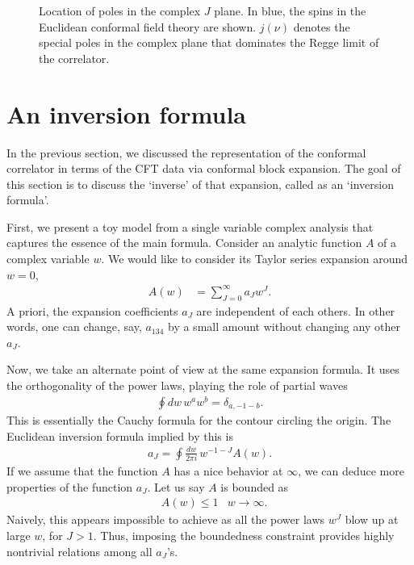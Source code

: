 \begin{figure}[t]
{
  }
  \caption{Location of poles in the complex $ J$ plane.
    In blue, the spins in the Euclidean conformal field theory are shown.
    $ j\left( \nu \right)  $ denotes the special poles in the complex plane that dominates the Regge limit of the correlator.}
  \label{fig:polesInJ}
\end{figure}

\section{An inversion formula}
In the previous section, we discussed the representation of the conformal correlator in terms of the CFT data via conformal block expansion.
The goal of this section is to discuss the `inverse' of that expansion, called as an `inversion formula'.

First, we present a toy model from a single variable complex analysis that captures the essence of the main formula.
Consider an analytic function $ A $ of a complex variable $ w $.
We would like to consider its Taylor series expansion around $ w = 0 $,
\begin{align}
  A\left( w \right) & = \sum_{J= 0 }^{\infty} a_J w^J
  .
\end{align}
A priori, the expansion coefficients $ a_J $ are independent of each others.
In other words, one can change, say, $ a_{134} $ by a small amount without changing any other $ a_J $.

Now, we take an alternate point of view at the same expansion formula.
It uses the orthogonality of the power laws, playing the role of partial waves
\begin{align}
  \oint dw \, w^a w^b = \delta_{a,-1-b}
  .
\end{align}
This is essentially the Cauchy formula for the contour circling the origin.
The Euclidean inversion formula implied by this is
\begin{align}
  a_J  =  \oint \frac{dw}{2\pi i} \, w^{-1-J} A\left( w \right)
  .
\end{align}
If we assume that the function $ A $ has a nice behavior at $ \infty $, we can deduce more properties of the function $ a_J $.
Let us say $ A $ is bounded as
\begin{align}
   & A\left( w \right) \leq 1 & w \rightarrow \infty
  .\end{align}
Naively, this appears impossible to achieve as all the power laws $ w^J $ blow up at large $ w $, for $ J>1 $.
Thus, imposing the boundedness constraint provides highly nontrivial relations among all $ a_J $'s.

